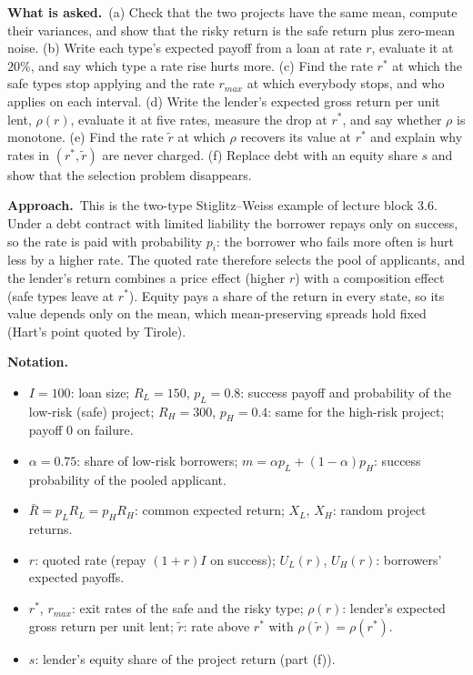 \documentclass[11pt,a4paper]{article}
\newcommand{\notation}{\par\noindent\textbf{Notation.}}
\newcommand{\asked}{\par\medskip\noindent\textbf{What is asked.}~}
\newcommand{\approach}{\par\smallskip\noindent\textbf{Approach.}~}
\begin{document}
\asked (a) Check that the two projects have the same mean, compute their variances, and show that the risky return is the safe return plus zero-mean noise. (b) Write each type's expected payoff from a loan at rate $r$, evaluate it at $20\%$, and say which type a rate rise hurts more. (c) Find the rate $r^*$ at which the safe types stop applying and the rate $r_{max}$ at which everybody stops, and who applies on each interval. (d) Write the lender's expected gross return per unit lent, $\rho(r)$, evaluate it at five rates, measure the drop at $r^*$, and say whether $\rho$ is monotone. (e) Find the rate $\tilde r$ at which $\rho$ recovers its value at $r^*$ and explain why rates in $(r^*,\tilde r)$ are never charged. (f) Replace debt with an equity share $s$ and show that the selection problem disappears.

\approach This is the two-type Stiglitz--Weiss example of lecture block 3.6. Under a debt contract with limited liability the borrower repays only on success, so the rate is paid with probability $p_i$: the borrower who fails more often is hurt less by a higher rate. The quoted rate therefore selects the pool of applicants, and the lender's return combines a price effect (higher $r$) with a composition effect (safe types leave at $r^*$). Equity pays a share of the return in every state, so its value depends only on the mean, which mean-preserving spreads hold fixed (Hart's point quoted by Tirole).

\notation
\begin{itemize}
  \item $I=100$: loan size; $R_L=150$, $p_L=0.8$: success payoff and probability of the low-risk (safe) project; $R_H=300$, $p_H=0.4$: same for the high-risk project; payoff 0 on failure.
  \item $\alpha=0.75$: share of low-risk borrowers; $m=\alpha p_L+(1-\alpha)p_H$: success probability of the pooled applicant.
  \item $\bar R=p_LR_L=p_HR_H$: common expected return; $X_L$, $X_H$: random project returns.
  \item $r$: quoted rate (repay $(1+r)I$ on success); $U_L(r)$, $U_H(r)$: borrowers' expected payoffs.
  \item $r^*$, $r_{max}$: exit rates of the safe and the risky type; $\rho(r)$: lender's expected gross return per unit lent; $\tilde r$: rate above $r^*$ with $\rho(\tilde r)=\rho(r^*)$.
  \item $s$: lender's equity share of the project return (part (f)).
\end{itemize}
\end{document}
